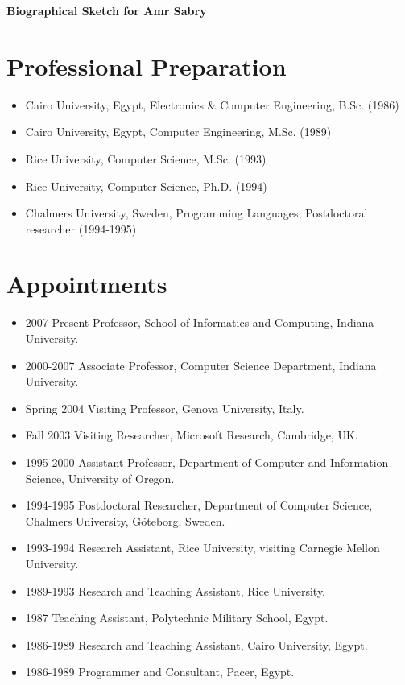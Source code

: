 \documentclass[11pt]{article}
\begin{document}

\begin{center}
{\Large {\bf Biographical Sketch for Amr Sabry}}
\end{center}

\section*{Professional Preparation}

\begin{itemize}
\item Cairo University, Egypt, Electronics \& Computer Engineering, B.Sc.
  (1986)
\item Cairo University, Egypt, Computer Engineering, M.Sc. (1989)
\item Rice University, Computer Science, M.Sc. (1993) 
\item Rice University, Computer Science, Ph.D. (1994) 
\item Chalmers University, Sweden, Programming Languages, Postdoctoral
  researcher (1994-1995)
\end{itemize}

\section*{Appointments}

\begin{itemize}
\item{2007-Present} Professor, School of Informatics and Computing,
Indiana University.
\item{2000-2007} Associate Professor, Computer Science Department,
Indiana University.
\item{Spring 2004} Visiting Professor, Genova University, Italy.
\item{Fall 2003} Visiting Researcher, Microsoft Research, Cambridge, UK.
\item{1995-2000} Assistant Professor, Department of Computer and
Information Science, University of Oregon.
\item{1994-1995} Postdoctoral Researcher, Department of Computer Science,
  Chalmers University, G\"oteborg, Sweden.
\item{1993-1994} Research Assistant, Rice University, visiting Carnegie 
Mellon University.
\item{1989-1993} Research and Teaching Assistant, Rice University.
\item{1987} Teaching Assistant, Polytechnic Military School, Egypt. 
\item{1986-1989} Research and Teaching Assistant, Cairo University, Egypt.
\item{1986-1989} Programmer and Consultant, Pacer, Egypt.
\end{itemize}
\end{document}
